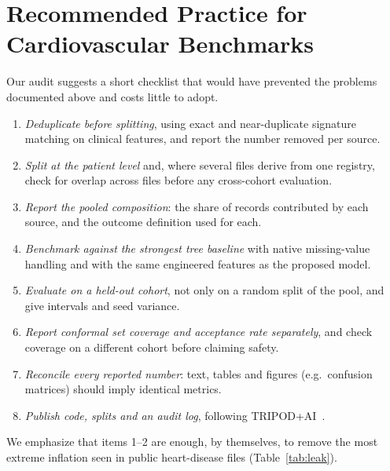 \documentclass[journal]{IEEEtran}
\begin{document}
\section{Recommended Practice for Cardiovascular Benchmarks}\label{sec:practice}
Our audit suggests a short checklist that would have prevented the problems documented above and costs little to adopt.
\begin{enumerate}
\item \emph{Deduplicate before splitting}, using exact and near-duplicate signature matching on clinical features, and report the number removed per source.
\item \emph{Split at the patient level} and, where several files derive from one registry, check for overlap across files before any cross-cohort evaluation.
\item \emph{Report the pooled composition}: the share of records contributed by each source, and the outcome definition used for each.
\item \emph{Benchmark against the strongest tree baseline} with native missing-value handling and with the same engineered features as the proposed model.
\item \emph{Evaluate on a held-out cohort}, not only on a random split of the pool, and give intervals and seed variance.
\item \emph{Report conformal set coverage and acceptance rate separately}, and check coverage on a different cohort before claiming safety.
\item \emph{Reconcile every reported number}: text, tables and figures (e.g.\ confusion matrices) should imply identical metrics.
\item \emph{Publish code, splits and an audit log}, following TRIPOD+AI~\cite{collins2024}.
\end{enumerate}
We emphasize that items 1--2 are enough, by themselves, to remove the most extreme inflation seen in public heart-disease files (Table~\ref{tab:leak}).

\end{document}
